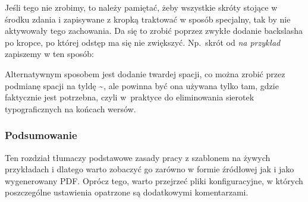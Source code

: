 Jeśli tego nie zrobimy, to należy pamiętać, żeby wszystkie skróty
stojące w środku zdania i zapisywane z kropką traktować w sposób
specjalny, tak by nie aktywowały tego zachowania. Da się to zrobić
poprzez zwykłe dodanie backslasha po kropce, po której odstęp ma się nie
zwiększyć. Np.\ skrót od \emph{na przykład} zapiszemy w ten sposób:

Alternatywnym sposobem jest dodanie twardej spacji, co można zrobić
przez podmianę spacji na tyldę \textasciitilde, ale powinna być ona
używana tylko tam, gdzie faktycznie jest potrzebna, czyli w~praktyce do
eliminowania sierotek typograficznych na końcach wersów.

\subsubsection{Podsumowanie}

Ten rozdział tłumaczy podstawowe zasady pracy z szablonem na żywych
przykładach i dlatego warto zobaczyć go zarówno w formie źródłowej jak
i jako wygenerowany PDF. Oprócz tego, warto przejrzeć pliki
konfiguracyjne, w których poszczególne ustawienia opatrzone są
dodatkowymi komentarzami.
